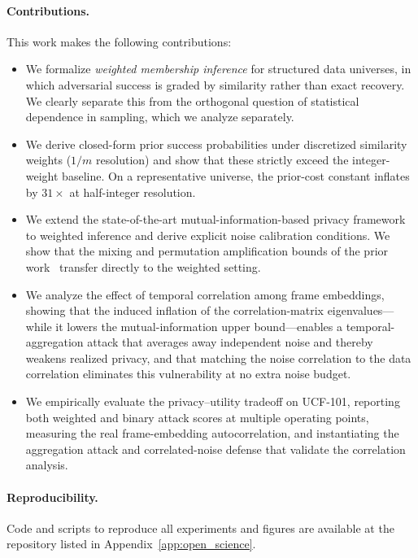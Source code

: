 \documentclass[letterpaper]{article} %
\begin{document}
\paragraph{Contributions.}
This work makes the following contributions:
\begin{itemize}
    \item We formalize \emph{weighted membership inference} for structured data universes, in which adversarial success is graded by similarity rather than exact recovery. We clearly separate this from the orthogonal question of statistical dependence in sampling, which we analyze separately.
    \item We derive closed-form prior success probabilities under discretized similarity weights ($1/m$ resolution) and show that these strictly exceed the integer-weight baseline. On a representative universe, the prior-cost constant inflates by $31{\times}$ at half-integer resolution.
    \item We extend the state-of-the-art mutual-information-based privacy framework~\cite{xiao2024formal} to weighted inference and derive explicit noise calibration conditions. We show that the mixing and permutation amplification bounds of the prior work~\cite{xiao2024formal} transfer directly to the weighted setting.
    \item We analyze the effect of temporal correlation among frame embeddings, showing that the induced inflation of the correlation-matrix eigenvalues---while it lowers the mutual-information upper bound---enables a temporal-aggregation attack that averages away independent noise and thereby weakens realized privacy, and that matching the noise correlation to the data correlation eliminates this vulnerability at no extra noise budget.
    \item We empirically evaluate the privacy--utility tradeoff on UCF-101, reporting both weighted and binary attack scores at multiple operating points, measuring the real frame-embedding autocorrelation, and instantiating the aggregation attack and correlated-noise defense that validate the correlation analysis.
\end{itemize}

\paragraph{Reproducibility.}
Code and scripts to reproduce all experiments and figures are available at the repository listed in Appendix~\ref{app:open_science}.
\end{document}
